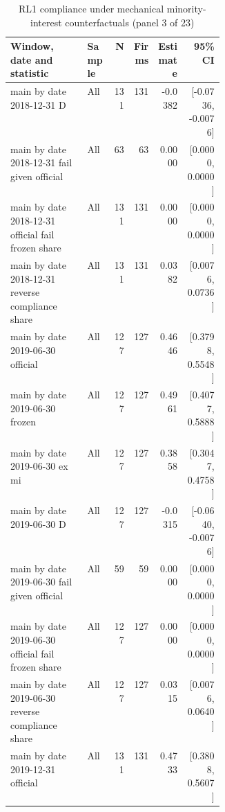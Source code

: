 \begin{table}[!htbp]\centering\scriptsize
\caption{RL1 compliance under mechanical minority-interest counterfactuals (panel 3 of 23)}
\begin{threeparttable}
\begin{tabular}{p{0.36\linewidth}lrrrr}
\toprule
Window, date and statistic & Sample & N & Firms & Estimate & 95\% CI \\
\midrule
main by date 2018-12-31 D & All & 131 & 131 & -0.0382 & [-0.0736, -0.0076] \\
main by date 2018-12-31 fail given official & All & 63 & 63 & 0.0000 & [0.0000, 0.0000] \\
main by date 2018-12-31 official fail frozen share & All & 131 & 131 & 0.0000 & [0.0000, 0.0000] \\
main by date 2018-12-31 reverse compliance share & All & 131 & 131 & 0.0382 & [0.0076, 0.0736] \\
main by date 2019-06-30 official & All & 127 & 127 & 0.4646 & [0.3798, 0.5548] \\
main by date 2019-06-30 frozen & All & 127 & 127 & 0.4961 & [0.4077, 0.5888] \\
main by date 2019-06-30 ex mi & All & 127 & 127 & 0.3858 & [0.3047, 0.4758] \\
main by date 2019-06-30 D & All & 127 & 127 & -0.0315 & [-0.0640, -0.0076] \\
main by date 2019-06-30 fail given official & All & 59 & 59 & 0.0000 & [0.0000, 0.0000] \\
main by date 2019-06-30 official fail frozen share & All & 127 & 127 & 0.0000 & [0.0000, 0.0000] \\
main by date 2019-06-30 reverse compliance share & All & 127 & 127 & 0.0315 & [0.0076, 0.0640] \\
main by date 2019-12-31 official & All & 131 & 131 & 0.4733 & [0.3808, 0.5607] \\
\bottomrule
\end{tabular}
\begin{tablenotes}[flushleft]\footnotesize

\end{tablenotes}
\end{threeparttable}
\end{table}
